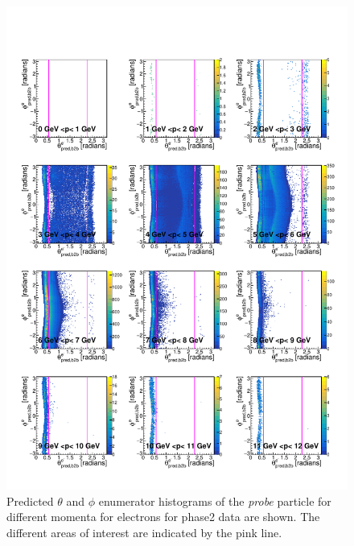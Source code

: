 \documentclass[a4paper,11pt,twosided,final,german,openbib,pdftex,listof=totoc,bibliography=totoc]{scrbook}
\begin{document}
\begin{appendix}
\begin{figure}[h!]
	\includegraphics[width=\textwidth]{Plots/master/RTPMemE_Data.pdf}
	\caption[Enumerator $\theta$-$\phi$ Electron Momentum Phase2 Data]{Predicted $\theta$ and $\phi$ enumerator histograms of the \textit{probe} particle for different momenta for electrons for phase2 data are shown. The different areas of interest are indicated by the pink line.}
	\label{plt:RTPMemE_Data}
\end{figure}




\end{appendix}
\end{document}
